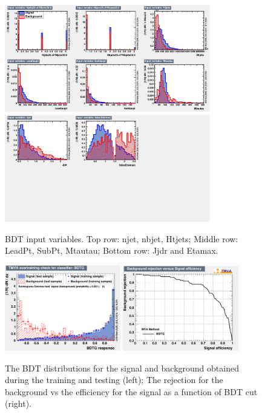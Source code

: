 \begin{figure}[htbp]
\centering
\begin{center}
  \includegraphics[width=0.8\textwidth, keepaspectratio]{fig/OneLepTwoTaus/variables_id_c1.pdf}
  \includegraphics[width=0.8\textwidth, keepaspectratio]{fig/OneLepTwoTaus/variables_id_c2.pdf}
\end{center}
\caption{BDT input variables. Top row: njet, nbjet, Htjets; Middle row: LeadPt, SubPt, Mtautau;
Bottom row: Jjdr and Etamax.}
\label{Fig:1l2tau.bdtinputs}
\end{figure}

\begin{figure}[htbp]
\centering
\begin{center}
  \includegraphics[width=0.45\textwidth, keepaspectratio]{fig/OneLepTwoTaus/overtrain_BDTG.pdf}
  \includegraphics[width=0.45\textwidth, keepaspectratio]{fig/OneLepTwoTaus/rejBvsS.pdf}
\end{center}
\caption{The BDT distributions for the signal and background obtained during the training and testing (left);
The rejection for the background vs the efficiency for the signal as a function of BDT cut (right).}
\label{Fig:1l2tau.bdt}
\end{figure}

